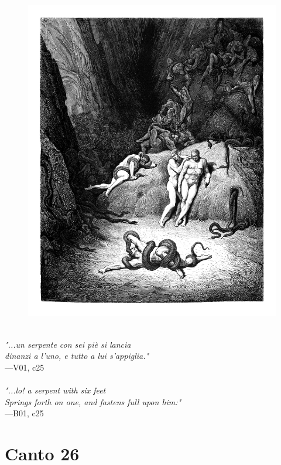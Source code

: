 \documentclass[../Dore_vision.tex]{subfiles}
\begin{document}
\begin{figure}[ht]
\centering
\includegraphics[height=\figsize]{illustrations/book_1/V01, c25.jpg}
\end{figure}

\begin{center}
\begin{minipage}{0.8\linewidth}
\textit{\\
"...un serpente con sei piè si lancia\\dinanzi a l’uno, e tutto a lui s’appiglia."} \\
—V01, c25 \\~\\
\textit{"...lo! a serpent with six feet\\Springs forth on one, and fastens full upon him:"} \\
—B01, c25
\end{minipage}
\end{center}

\newpage

\section{Canto 26}
\end{document}

